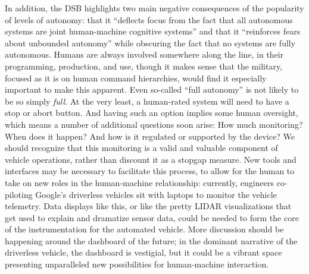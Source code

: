 In addition, the DSB highlights two main negative consequences of the popularity of
levels of autonomy: that it ``deflects focus from the fact that all
autonomous systems are joint human-machine cognitive systems''\cite{???} and
that it ``reinforces fears about unbounded autonomy'' while obscuring
the fact that no systems are fully autonomous\cite{???}. Humans are always
involved somewhere along the line, in their programming, production,
and use, though it makes sense that the military, focused as it is on
human command hierarchies, would find it especially important to make
this apparent. Even so-called ``full autonomy'' is not likely to be so
simply \emph{full}. At the very least, a human-rated system will need to have
a stop or abort button. And having such an option implies some human
oversight, which means a number of additional questions soon arise:
How much monitoring? When does it happen? And how is it
regulated or supported by the device? We should recognize that this
monitoring is a valid and valuable component of vehicle operations,
rather than discount it as a stopgap measure. New tools and interfaces
may be necessary to facilitate this process, to allow for the human to
take on new roles in the human-machine relationship: currently, engineers
co-piloting Google's driverless vehicles sit with laptops to monitor
the vehicle telemetry\cite{???-article-from-DM-class}. Data displays
like this, or like the pretty LIDAR visualizations that get used to
explain and dramatize sensor data, could be needed to form the core of the
instrumentation for the automated vehicle. More discussion should be
happening around the dashboard of the future; in the dominant
narrative of the driverless vehicle, the dashboard is vestigial, but
it could be a vibrant space presenting unparalleled new possibilities
for human-machine interaction.


